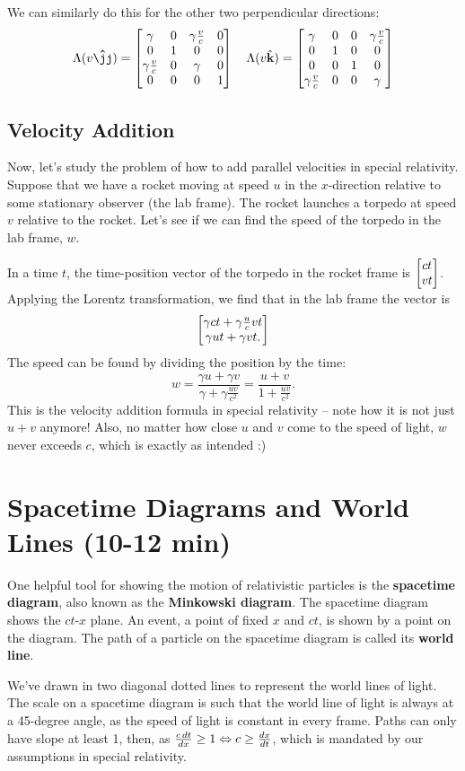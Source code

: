 \documentclass[12pt]{scrartcl}
\newcommand{\incfig}[2]{
    \def\svgscale{#1}
    
}
\begin{document}
We can similarly do this for the other two perpendicular directions:
\[ \Lambda(v \jhatt) =
	\bmat{
		\gamma             & 0 & \gamma \frac{v}{c} & 0 \\
		0                  & 1 & 0                  & 0 \\
		\gamma \frac{v}{c} & 0 & \gamma             & 0 \\
		0                  & 0 & 0                  & 1
	}
	\quad
	\Lambda(v\hat{\bf k}) =
	\bmat{
		\gamma             & 0 & 0 & \gamma\frac{v}{c} \\
		0                  & 1 & 0 & 0                 \\
		0                  & 0 & 1 & 0                 \\
		\gamma \frac{v}{c} & 0 & 0 & \gamma
	}
\]

\subsection*{Velocity Addition}
Now, let's study the problem of how to add parallel velocities in special relativity. Suppose that we have a rocket moving at speed $u$ in the $x$-direction relative to some stationary observer (the lab frame). The rocket launches a torpedo at speed $v$ relative to the rocket. Let's see if we can find the speed of the torpedo in the lab frame, $w$.

In a time $t$, the time-position vector of the torpedo in the rocket frame is $\begin{bmatrix}ct \\ vt\end{bmatrix}$. Applying the Lorentz transformation, we find that in the lab frame the vector is
\[
	\begin{bmatrix}
		\gamma c t + \gamma \frac u c v t \\
		\gamma u t + \gamma v t.
	\end{bmatrix}
\]
The speed can be found by dividing the position by the time:
\[
	w = \frac{\gamma u + \gamma v}{\gamma + \gamma \frac{uv}{c^2}} = \frac{u+v}{1+\frac{uv}{c^2}}.
\]
This is the velocity addition formula in special relativity -- note how it is not just $u + v$ anymore! Also, no matter how close $u$ and $v$ come to the speed of light, $w$ never exceeds $c$, which is exactly as intended :)

\section{Spacetime Diagrams and World Lines (10-12 min)}
One helpful tool for showing the motion of relativistic particles is the \textbf{spacetime diagram}, also known as the \textbf{Minkowski diagram}. The spacetime diagram shows the $ct$-$x$ plane. An event, a point of fixed $x$ and $ct$, is shown by a point on the diagram. The path of a particle on the spacetime diagram is called its \textbf{world line}.
\begin{center}
	\incfig{2.5}{figures/minkowski-diag}
\end{center}
We've drawn in two diagonal dotted lines to represent the world lines of light. The scale on a spacetime diagram is such that the world line of light is always at a 45-degree angle, as the speed of light is constant in every frame. Paths can only have slope at least 1, then, as $\frac{c \, dt}{dx} \geq 1 \Leftrightarrow c \geq \frac{d x}{d t}$, which is mandated by our assumptions in special relativity.
\end{document}
